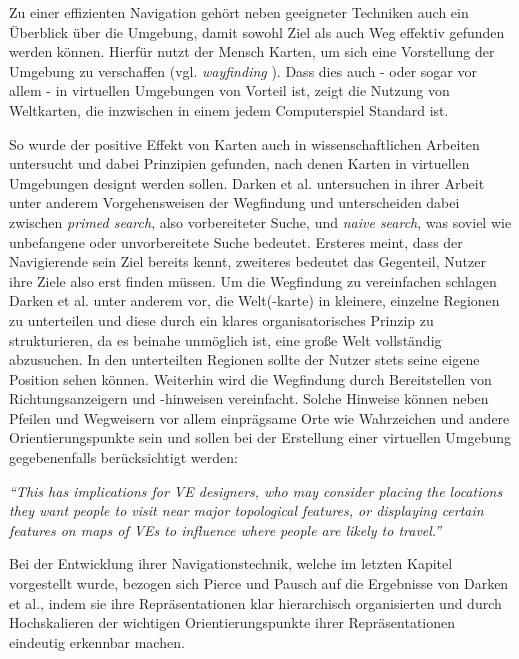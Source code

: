 Zu einer effizienten Navigation gehört neben geeigneter Techniken auch ein Überblick über die Umgebung, damit sowohl Ziel als auch Weg effektiv gefunden werden können.
Hierfür nutzt der Mensch Karten, um sich eine Vorstellung der Umgebung zu verschaffen (vgl. \textit{wayfinding} \cite{Bowman2001AnDesign}). Dass dies auch - oder sogar vor allem - in virtuellen Umgebungen von Vorteil ist, zeigt die Nutzung von Weltkarten, die inzwischen in einem jedem Computerspiel Standard ist. 

So wurde der positive Effekt von Karten auch in wissenschaftlichen Arbeiten untersucht und dabei Prinzipien gefunden, nach denen Karten in virtuellen Umgebungen designt werden sollen.
Darken et al. \cite{12_Darken1996_WayfindingStrategies} untersuchen in ihrer Arbeit unter anderem Vorgehensweisen der Wegfindung und unterscheiden dabei zwischen \textit{primed search}, also vorbereiteter Suche, und \textit{naive search}, was soviel wie unbefangene oder unvorbereitete Suche bedeutet.
Ersteres meint, dass der Navigierende sein Ziel bereits kennt, zweiteres bedeutet das Gegenteil, Nutzer ihre Ziele also erst finden müssen.
Um die Wegfindung zu vereinfachen schlagen Darken et al. unter anderem vor, die Welt(-karte) in kleinere, einzelne Regionen zu unterteilen und diese durch ein \glqq klares organisatorisches Prinzip\grqq{} zu strukturieren, da es beinahe unmöglich ist, eine große Welt vollständig abzusuchen. In den unterteilten Regionen sollte der Nutzer stets seine eigene Position sehen können. 
Weiterhin wird die Wegfindung durch Bereitstellen von Richtungsanzeigern und -hinweisen vereinfacht. Solche Hinweise können neben Pfeilen und Wegweisern vor allem einprägsame Orte wie Wahrzeichen und andere Orientierungspunkte sein und sollen bei der Erstellung einer virtuellen Umgebung gegebenenfalls berücksichtigt werden:

\begin{addmargin}[25pt]{0pt} 

\textit{“This has implications for VE designers, who may consider placing the locations they want
people to visit near major topological features, or displaying certain features on maps of
VEs to influence where people are likely to travel.”} \cite{12_Darken1996_WayfindingStrategies}

\end{addmargin}

Bei der Entwicklung ihrer Navigationstechnik, welche im letzten Kapitel vorgestellt wurde, bezogen sich Pierce und Pausch \cite{pierce_representations} auf die Ergebnisse von Darken et al., indem sie ihre Repräsentationen klar hierarchisch organisierten und durch Hochskalieren der wichtigen Orientierungspunkte ihrer Repräsentationen eindeutig erkennbar machen.

